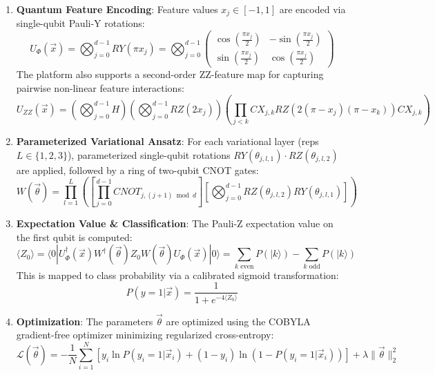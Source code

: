 \documentclass[10pt,a4paper]{article}
\begin{document}
\begin{enumerate}
    \item \textbf{Quantum Feature Encoding}: Feature values $x_j \in [-1, 1]$ are encoded via single-qubit Pauli-Y rotations:
    \begin{equation}
    U_\Phi(\vec{x}) = \bigotimes_{j=0}^{d-1} RY(\pi x_j) = \bigotimes_{j=0}^{d-1} \begin{pmatrix} \cos(\frac{\pi x_j}{2}) & -\sin(\frac{\pi x_j}{2}) \\ \sin(\frac{\pi x_j}{2}) & \cos(\frac{\pi x_j}{2}) \end{pmatrix}
    \end{equation}
    The platform also supports a second-order ZZ-feature map for capturing pairwise non-linear feature interactions:
    \begin{equation}
    U_{ZZ}(\vec{x}) = \left(\bigotimes_{j=0}^{d-1} H\right) \left(\bigotimes_{j=0}^{d-1} RZ(2x_j)\right) \left(\prod_{j < k} CX_{j,k} RZ(2(\pi - x_j)(\pi - x_k)) CX_{j,k}\right)
    \end{equation}
    \item \textbf{Parameterized Variational Ansatz}: For each variational layer (reps $L \in \{1, 2, 3\}$), parameterized single-qubit rotations $RY(\theta_{j,l,1}) \cdot RZ(\theta_{j,l,2})$ are applied, followed by a ring of two-qubit CNOT gates:
    \begin{equation}
    W(\vec{\theta}) = \prod_{l=1}^L \left( \left[ \prod_{j=0}^{d-1} CNOT_{j, (j+1)\bmod d} \right] \left[ \bigotimes_{j=0}^{d-1} RZ(\theta_{j,l,2}) RY(\theta_{j,l,1}) \right] \right)
    \end{equation}
    \item \textbf{Expectation Value \& Classification}: The Pauli-Z expectation value on the first qubit is computed:
    \begin{equation}
    \langle Z_0 \rangle = \langle 0 | U_\Phi^\dagger(\vec{x}) W^\dagger(\vec{\theta}) Z_0 W(\vec{\theta}) U_\Phi(\vec{x}) | 0 \rangle = \sum_{k \text{ even}} P(|k\rangle) - \sum_{k \text{ odd}} P(|k\rangle)
    \end{equation}
    This is mapped to class probability via a calibrated sigmoid transformation:
    \begin{equation}
    P(y=1|\vec{x}) = \frac{1}{1 + e^{-4 \langle Z_0 \rangle}}
    \end{equation}
    \item \textbf{Optimization}: The parameters $\vec{\theta}$ are optimized using the COBYLA gradient-free optimizer minimizing regularized cross-entropy:
    \begin{equation}
    \mathcal{L}(\vec{\theta}) = -\frac{1}{N} \sum_{i=1}^N \left[ y_i \ln P(y_i=1|\vec{x}_i) + (1 - y_i) \ln (1 - P(y_i=1|\vec{x}_i)) \right] + \lambda \|\vec{\theta}\|_2^2
    \end{equation}
\end{enumerate}
\end{document}
